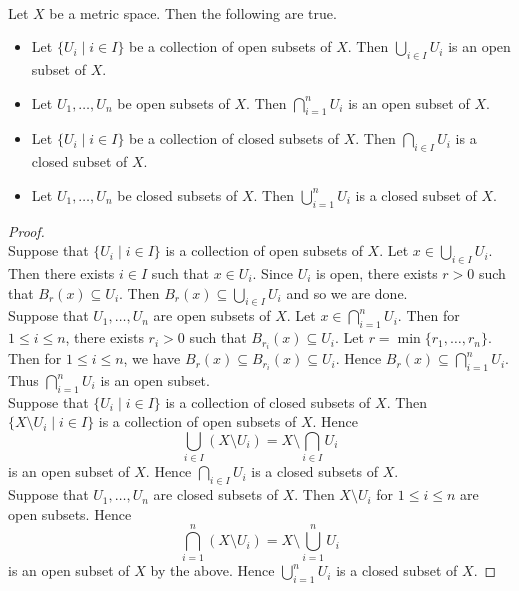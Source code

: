 \documentclass[a4paper]{article}
\begin{document}
\begin{prp}{}{}\\
Let $X$ be a metric space. Then the following are true. 
\begin{itemize}
\item Let $\{U_i\;|\;i\in I\}$ be a collection of open subsets of $X$. Then $\bigcup_{i\in I}U_i$ is an open subset of $X$. 
\item Let $U_1,\dots,U_n$ be open subsets of $X$. Then $\bigcap_{i=1}^nU_i$ is an open subset of $X$. 
\item Let $\{U_i\;|\;i\in I\}$ be a collection of closed subsets of $X$. Then $\bigcap_{i\in I}U_i$ is a closed subset of $X$. 
\item Let $U_1,\dots,U_n$ be closed subsets of $X$. Then $\bigcup_{i=1}^nU_i$ is a closed subset of $X$. 
\end{itemize} 
\begin{proof}\\
Suppose that $\{U_i\;|\;i\in I\}$ is a collection of open subsets of $X$. Let $x\in\bigcup_{i\in I}U_i$. Then there exists $i\in I$ such that $x\in U_i$. Since $U_i$ is open, there exists $r>0$ such that $B_r(x)\subseteq U_i$. Then $B_r(x)\subseteq\bigcup_{i\in I}U_i$ and so we are done. \\

Suppose that $U_1,\dots,U_n$ are open subsets of $X$. Let $x\in\bigcap_{i=1}^nU_i$. Then for $1\leq i\leq n$, there exists $r_i>0$ such that $B_{r_i}(x)\subseteq U_i$. Let $r=\min\{r_1,\dots,r_n\}$. Then for $1\leq i\leq n$, we have $B_r(x)\subseteq B_{r_i}(x)\subseteq U_i$. Hence $B_r(x)\subseteq\bigcap_{i=1}^nU_i$. Thus $\bigcap_{i=1}^nU_i$ is an open subset. \\
 
Suppose that $\{U_i\;|\;i\in I\}$ is a collection of closed subsets of $X$. Then $\{X\setminus U_i\;|\;i\in I\}$ is a collection of open subsets of $X$. Hence $$\bigcup_{i\in I}(X\setminus U_i)=X\setminus\bigcap_{i\in I}U_i$$ is an open subset of $X$. Hence $\bigcap_{i\in I}U_i$ is a closed subsets of $X$. \\

Suppose that $U_1,\dots,U_n$ are closed subsets of $X$. Then $X\setminus U_i$ for $1\leq i\leq n$ are open subsets. Hence $$\bigcap_{i=1}^n(X\setminus U_i)=X\setminus\bigcup_{i=1}^nU_i$$ is an open subset of $X$ by the above. Hence $\bigcup_{i=1}^nU_i$ is a closed subset of $X$. 
\end{proof}
\end{prp}
\end{document}

